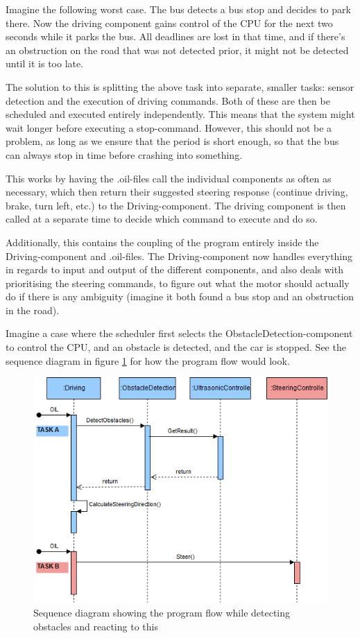 Imagine the following worst case. The bus detects a bus stop and decides to park there. Now the driving component gains control of the CPU for the next two seconds while it parks the bus. All deadlines are lost in that time, and if there's an obstruction on the road that was not detected prior, it might not be detected until it is too late. 

The solution to this is splitting the above task into separate, smaller tasks: sensor detection and the execution of driving commands. Both of these are then be scheduled and executed entirely independently. This means that the system might wait longer before executing a stop-command. However, this should not be a problem, as long as we ensure that the period is short enough, so that the bus can always stop in time before crashing into something. 

This works by having the .oil-files call the individual components as often as necessary, which then return their suggested steering response (continue driving, brake, turn left, etc.) to the Driving-component. The driving component is then called at a separate time to decide which command to execute and do so.

Additionally, this contains the coupling of the program entirely inside the Driving-component and .oil-files. The Driving-component now handles everything in regards to input and output of the different components, and also deals with prioritising the steering commands, to figure out what the motor should actually do if there is any ambiguity (imagine it both found a bus stop and an obstruction in the road). 

Imagine a case where the scheduler first selects the ObstacleDetection-component to control the CPU, and an obstacle is detected, and the car is stopped. See the sequence diagram in figure \ref{fig:sequenceDetectObstacle} for how the program flow would look.

\begin{figure}[ht]
    \includegraphics[width=\textwidth]{Images/Design/sequenceObstacleDetection.png}
    \caption{Sequence diagram showing the program flow while detecting obstacles and reacting to this}
    \label{fig:sequenceDetectObstacle}
\end{figure}

